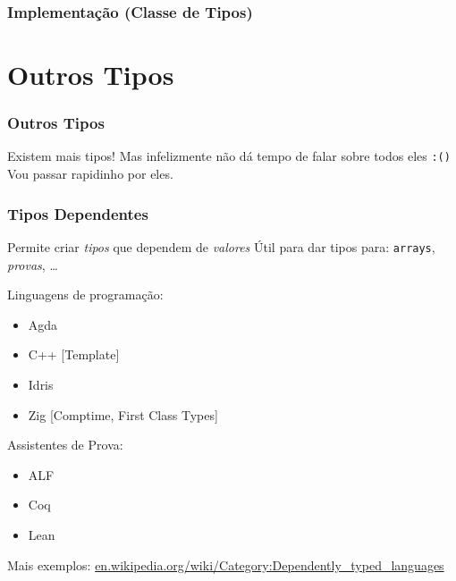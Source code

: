 \documentclass{beamer}
\begin{document}
\begin{frame}
    \frametitle{Implementação (Classe de Tipos)}
\end{frame}

\section{Outros Tipos}
\begin{frame}
    \frametitle{Outros Tipos}
    Existem mais tipos!
    \vfill
    Mas infelizmente não dá tempo de falar sobre todos eles
    \texttt{:(\phantom)}
    \vfill
    Vou passar rapidinho por eles.
\end{frame}

\begin{frame}
    \frametitle{Tipos Dependentes}
    Permite criar \emph{tipos} que dependem de \emph{valores}
    \vfill
    Útil para dar tipos para: \texttt{arrays}, \emph{provas}, \dots
    \vfill
    \begin{multicols}{2}
        Linguagens de programação:
        \begin{itemize}
            \item Agda
            \item C++ [Template]
            \item Idris
            \item Zig [Comptime, First Class Types]
        \end{itemize}
        \columnbreak
        Assistentes de Prova:
        \begin{itemize}
            \item ALF
            \item Coq
            \item Lean
        \end{itemize}
    \end{multicols}
    \vfill
    Mais exemplos:
    \url{en.wikipedia.org/wiki/Category:Dependently_typed_languages}
\end{frame}
\end{document}
